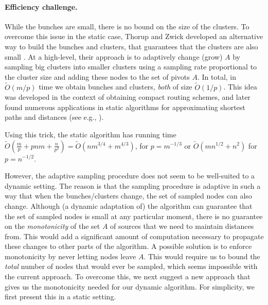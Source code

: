 \paragraph{Efficiency challenge.}
While the bunches are small, there is no bound on the size of the clusters. To overcome this issue in the static case, Thorup and Zwick developed an alternative way to build the bunches and clusters, that guarantees that the clusters are also small \cite{TZ01}. At a high-level, their approach is to adaptively change (grow) $A$ by sampling big clusters into smaller clusters using a sampling rate proportional to the cluster size and adding these nodes to the set of pivots $A$. In total, in $\tilde O(m/p)$ time we obtain bunches and clusters, \emph{both} of size $\tilde O(1/p)$.
This idea was developed in the context of obtaining compact routing schemes, and later found numerous applications in static algorithms for approximating shortest paths and distances (see e.g., \cite{BaswanaK10,AkavR20,backurs2021toward,AkavR21}).

Using this trick, the static algorithm has running time $\tilde {O}(\tfrac{m}{p}+pnm+\tfrac{n}{p^2})=\tilde O(nm^{3/4}+m^{4/3})$, for $p=m^{-1/3}$ or $\tilde O(mn^{1/2}+n^2)$ for $p=n^{-1/2}$. 


However, the adaptive sampling procedure does not seem to be well-suited to a dynamic setting. The reason is that the sampling procedure is adaptive in such a way that when the bunches/clusters change, the set of sampled nodes can also change. Although (a dynamic adaptation of) the algorithm can guarantee that the set of sampled nodes is small at any particular moment, there is no guarantee on the \emph{monotonicity} of the set $A$ of sources that we need to maintain distances from. This would add a significant amount of computation necessary to propagate these changes to other parts of the algorithm. A possible solution is to enforce monotonicity by never letting nodes leave $A$. This would require us to bound the \emph{total} number of nodes that would ever be sampled, which seems impossible with the current approach. 
To overcome this, we next suggest a new approach that gives us the monotonicity needed for our dynamic algorithm. For simplicity, we first present this in a static setting. 



